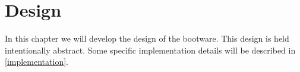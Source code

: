 \chapter{Design}
\label{design}

In this chapter we will develop the design of the bootware.
This design is held intentionally abstract.
Some specific implementation details will be described in \autoref{implementation}.













